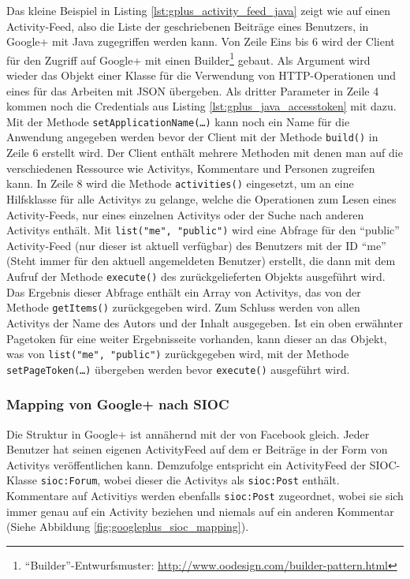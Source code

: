 Das kleine Beispiel in Listing \ref{lst:gplus_activity_feed_java} zeigt wie auf einen Activity-Feed, also die Liste der geschriebenen Beiträge eines Benutzers, in Google+ mit Java zugegriffen werden kann. Von Zeile Eins bis 6 wird der Client für den Zugriff auf Google+ mit einen Builder\footnote{\enquote{Builder}-Entwurfsmuster: \url{http://www.oodesign.com/builder-pattern.html}} gebaut. Als Argument wird wieder das Objekt einer Klasse für die Verwendung von HTTP-Operationen und eines für das Arbeiten mit JSON übergeben. Als dritter Parameter in Zeile 4 kommen noch die Credentials aus Listing \ref{lst:gplus_java_accesstoken} mit dazu. Mit der Methode \texttt{setApplicationName(\dots)} kann noch ein Name für die Anwendung angegeben werden bevor der Client mit der Methode \texttt{build()} in Zeile 6 erstellt wird. Der Client enthält mehrere Methoden mit denen man auf die verschiedenen Ressource wie Activitys, Kommentare und Personen zugreifen kann. In Zeile 8 wird die Methode \texttt{activities()} eingesetzt, um an eine Hilfsklasse für alle Activitys zu gelange, welche die Operationen zum Lesen eines Activity-Feeds, nur eines einzelnen Activitys oder der Suche nach anderen Activitys enthält. Mit \texttt{list("me", "public")} wird eine Abfrage für den \enquote{public} Activity-Feed (nur dieser ist aktuell verfügbar) des Benutzers mit der ID \enquote{me} (Steht immer für den aktuell angemeldeten Benutzer) erstellt, die dann mit dem Aufruf der Methode \texttt{execute()} des zurückgelieferten Objekts ausgeführt wird. Das Ergebnis dieser Abfrage enthält ein Array von Activitys, das von der Methode \texttt{getItems()} zurückgegeben wird. Zum Schluss werden von allen Activitys der Name des Autors und der Inhalt ausgegeben. Ist ein oben erwähnter Pagetoken für eine weiter Ergebnisseite vorhanden, kann dieser an das Objekt, was von \texttt{list("me", "public")} zurückgegeben wird, mit der Methode \texttt{setPageToken(\dots)} übergeben werden bevor \texttt{execute()} ausgeführt wird.


\subsubsection{Mapping von Google+ nach SIOC} %
\label{ssub:google_mapping_nach_sioc}

Die Struktur in Google+ ist annähernd mit der von Facebook gleich. Jeder Benutzer hat seinen eigenen ActivityFeed auf dem er Beiträge in der Form von Activitys veröffentlichen kann. Demzufolge entspricht ein ActivityFeed der SIOC-Klasse \texttt{sioc:Forum}, wobei dieser die Activitys als \texttt{sioc:Post} enthält. Kommentare auf Activitiys werden ebenfalls \texttt{sioc:Post} zugeordnet, wobei sie sich immer genau auf ein Activity beziehen und niemals auf ein anderen Kommentar (Siehe Abbildung \ref{fig:googleplus_sioc_mapping}). 

